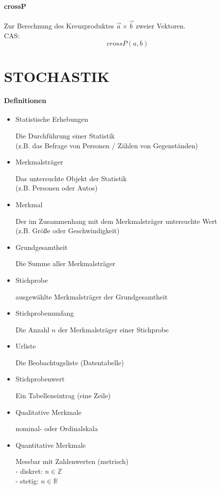\documentclass[a4paper,12pt]{article}
\begin{document}
\subsection{crossP}
Zur Berechnung des Kreuzproduktes $\vec{a} \times \vec{b}$ zweier Vektoren.\\
CAS:\\
$$crossP(a,b)$$
\pagebreak
\part{STOCHASTIK}
\subsection{Definitionen}
\begin{itemize}
\item Statistische Erhebungen
	\subitem \parbox[t]{\linewidth}{
	Die Durchführung einer Statistik\\
    (z.B. das Befrage von Personen / Zählen von Gegenständen)\\
	}
\item Merkmalsträger
	\subitem \parbox[t]{\linewidth}{
	Das untersuchte Objekt der Statistik\\
    (z.B. Personen oder Autos)
	}
\item Merkmal
	\subitem \parbox[t]{\linewidth}{
	Der im Zusammenhang mit dem Merkmalsträger untersuchte Wert\\
    (z.B. Größe oder Geschwindigkeit)
	}
\item Grundgesamtheit
	\subitem \parbox[t]{\linewidth}{
	Die Summe aller Merkmalsträger
	}
\item Stichprobe
	\subitem \parbox[t]{\linewidth}{
	ausgewählte Merkmalsträger der Grundgesamtheit
	}
\item Stichprobenumfang
	\subitem \parbox[t]{\linewidth}{
	Die Anzahl $n$ der Merkmalsträger einer Stichprobe
	}
\item Urliste
	\subitem \parbox[t]{\linewidth}{
	Die Beobachtugsliste (Datentabelle)
	}
\item Stichprobenwert
	\subitem \parbox[t]{\linewidth}{
	Ein Tabelleneintrag (eine Zeile)
	}
\item Qualitative Merkmale
	\subitem \parbox[t]{\linewidth}{
	nominal- oder Ordinalskala
	}
\item Quantitative Merkmale
	\subitem \parbox[t]{\linewidth}{
	Messbar mit Zahlenwerten (metrisch)\\
    - diskret: $n \in \mathbb{Z}$\\
    - stetig: $n \in \mathbb{R}$
}
\end{itemize}
\end{document}
